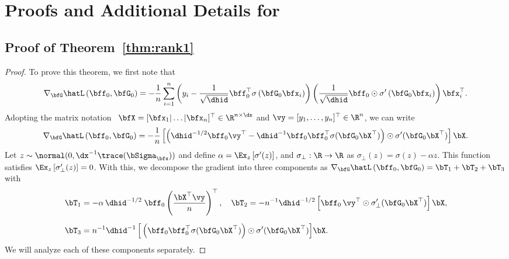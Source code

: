 \section{Proofs and Additional Details for }

\subsection{Proof of Theorem~\ref{thm:rank1}}
\label{pfthm:rank1}
\OneStepSGD*
\begin{proof}
    To prove this theorem, we first note that
    \begin{align*}
    \nabla_\bfG \hatL\,(\bff_0,\bfG_0) = -\frac{1}{n} \sum_{i= 1}^{n}\left(y_i - \frac{1}{\sqrt{\dhid}}\bff_{0}^\top \sigma\left(\bfG_{0} \bfx_i\right)\right)\left(\frac{1}{\sqrt{\dhid}}\bff_{0} \odot \sigma'\left(\bfG_{0}\bfx_i\right)\right)\bfx_i^\top.
    \end{align*}
    Adopting the matrix notation
    \ $\bfX = [\bfx_1 | \dots | \bfx_n]^\top \in \R^{n \times \dx}$ and $\vy = [y_1, \dots, y_n]^\top \in \R^n$, we can write
    \begin{align}
        \label{eq:gradient}
        \nabla_\bfG \hatL\,(\bff_0,\bfG_0) = -\frac{1}{n}\left[\left(\dhid^{-1/2}\bff_0\vy^\top - \dhid^{-1}\bff_0\bff_0^\top \sigma(\bfG_{0} \bX^\top)\right)\odot \sigma'(\bfG_{0}\bX^\top)\right]\bX.
    \end{align}
    Let $ {z \sim \normal(0, \dx^{-1}\trace(\bSigma_\bfx))}$ and define $\alpha = \Ex_z \left[\sigma'(z)\right]$, and $\sigma_\perp: \R \to \R$ as $\sigma_\perp(z) =  \sigma(z) - \alpha z $. This function satisfies $\Ex_z \left[\sigma_\perp'(z)\right] = 0$. With this, we decompose the gradient into three components as $\nabla_\bfG \hatL\,(\bff_0,\bfG_0) = \bT_1 + \bT_2 + \bT_3$ with
    \begin{align*}
        &\bT_1 =  - \alpha\, \dhid^{-1/2} \; \bff_0 \left(\frac{\bX^\top\vy}{n}\right)^\top,\quad \bT_2 = -n^{-1} \dhid^{-1/2} \left[\bff_0 \,\vy^\top \odot \sigma_\perp'(\bfG_0 \bX^\top)\right]\bX,\\[0.2cm]
        &\bT_3 = n^{-1} \dhid^{-1} \,\Big[\left(\bff_0 \bff_0^\top \sigma(\bfG_0 \bX^\top)\right) \odot \sigma'(\bfG_0 \bX^\top)\Big]\bX.
    \end{align*}
    We will analyze each of these components separately.
    

\end{proof}
